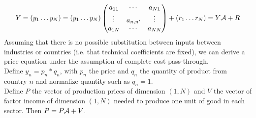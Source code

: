 \documentclass[11pt,a4paper]{article}
\begin{document}
\begin{eqnarray*}
	Y=(y_1\ldots y_N)=\left(y_1\ldots y_N\right)\left( \begin{matrix}
   a_{11} & \cdots  & a_{N1}  \\
   \vdots  & a_{n,n'} & \vdots   \\
   a_{1N} & \cdots  & a_{NN}  \\
\end{matrix} \right)+(r_1\ldots r_N)=Y {\cal A} +  R
\end{eqnarray*}
Assuming that there is no possible substitution between inputs between industries or countries (i.e. that technical coefficients are fixed), we can derive a price equation under the assumption of complete cost pass-through.\\

Define $y_n=p_n*q_n$, with $p_n$ the price and $q_n$ the quantity of product from country $n$ and normalize quantity such as $q_n=1$. \\
Define $P$ the vector of production prices of dimension $(1, N)$ and $V$ the vector of factor income of dimension $(1, N)$ needed to produce one unit of good in each sector. Then $P=P{\cal A}+V$. \\


\end{document}
